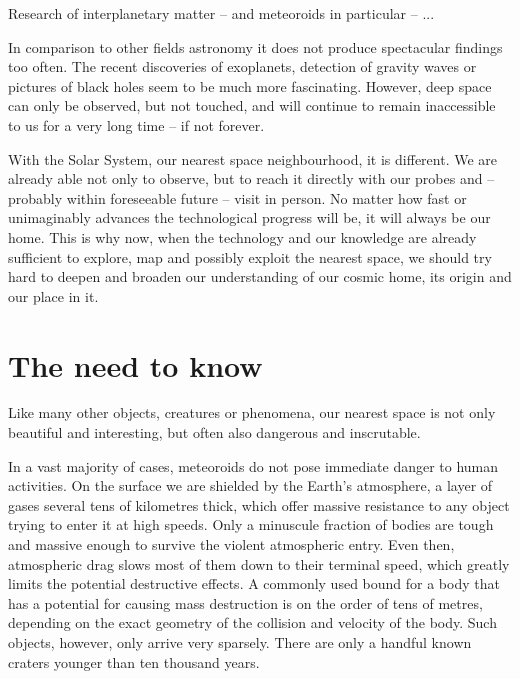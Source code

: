 

Research of interplanetary matter -- and meteoroids in particular -- 
... 



In comparison to other fields astronomy it does not produce spectacular findings too often.
The recent discoveries of exoplanets, detection of gravity waves or pictures of black holes seem to be much more fascinating.
However, deep space can only be observed, but not touched, and will continue to remain
inaccessible to us for a very long time -- if not forever.

With the Solar System, our nearest space neighbourhood, it is different. We are already able not only to observe,
but to reach it directly with our probes and -- probably within foreseeable future -- visit in person.
No matter how fast or unimaginably advances the technological progress will be, it will always be our home.
This is why now, when the technology and our knowledge are already sufficient to explore, map and possibly exploit
the nearest space, we should try hard to deepen and broaden our understanding of our cosmic home, its origin and our place in it.

\section{The need to know} \label{in}

    Like many other objects, creatures or phenomena, our nearest space is not only beautiful and interesting, but often
    also dangerous and inscrutable.




    In a vast majority of cases, meteoroids do not pose immediate danger to human activities.
    On the surface we are shielded by the Earth's atmosphere, a layer of gases several tens of kilometres
    thick, which offer massive resistance to any object trying to enter it at high speeds.
    Only a minuscule fraction of bodies are tough and massive enough to survive the violent atmospheric entry.
    Even then, atmospheric drag slows most of them down to their terminal speed, which greatly limits the potential destructive effects.
    A commonly used bound for a body that has a potential for causing mass destruction is on the order of tens of metres,
    depending on the exact geometry of the collision and velocity of the body. Such objects, however, only arrive very sparsely.
    There are only a handful known craters younger than ten thousand years.

